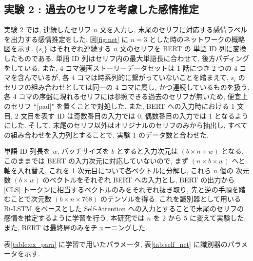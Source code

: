 \documentclass[twocolumn]{jarticle}     %
\begin{document}
\subsection{\small{実験 2 : 過去のセリフを考慮した感情推定}}
実験 2 では, 連続したセリフ $n$ 文を入力し, 末尾のセリフに対応する感情ラベルを出力する感情推定をした.
図\ref{fig:net} に $n = 3$ とした時のネットワークの概略図を示す. $\{s_i\}$ はそれぞれ連続する $n$ 文のセリフを BERT の 単語 ID 列に変換したものである. 単語 ID 列はセリフ内の最大単語長に合わせて, 後方パディングをしている. また, 4 コマ漫画ストーリーデータセットは 1 話につき 2 つの 4 コマを含んでいるが, 各 4 コマは時系列的に繋がっていないことを踏まえて, ${s_i}$ のセリフの組み合わせとしては同一の 4 コマに属し, かつ連続しているものを扱う. 各 4 コマの序盤に現れるセリフには参照できる過去のセリフが無いため, 便宜上のセリフ ``$[$pad$]$" を置くことで対処した. また, BERT への入力時における 1 文目, 2 文目を表す ID は奇数番目の入力では 0, 偶数番目の入力では 1 となるようにした. そして, 末尾のセリフ以外はオリジナルのセリフのみから抽出し, すべての組み合わせを入力列とすることで, 実験 1 のデータ数と合わせた.

単語 ID 列長を $w$, バッチサイズを $b$ とすると入力次元は $(b \times n \times w)$ となる. このままでは BERT の入力次元に対応していないので, まず $(n \times b \times w)$ へと軸を入れ替え, これを 1 次元目について各ベクトルに分解し, これら $n$ 個の 次元数 $(b \times w)$ のベクトルをそれぞれ BERT への入力とし, BERT の出力から [CLS] トークンに相当するベクトルのみをそれぞれ抜き取り, 先と逆の手順を踏むことで次元数 $(b \times n \times 768)$ のテンソルを得る. これを識別器として用いる Bi-LSTM をベースとした Self-Attention への入力とすることで末尾のセリフの感情を推定するように学習を行う. 本研究では $n$ を 2 から 5 に変えて実験した. また, BERT は最終層のみをチューニングした.

表\ref{table:ex_para} に学習で用いたパラメータ, 表\ref{tab:self_net} に識別器のパラメータを示す.
\end{document}
